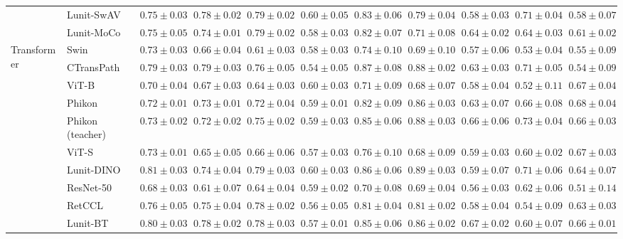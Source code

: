 \begin{tabular}{ll|cccc|c|cccc}
 & Lunit-SwAV & $0.75 \pm 0.03$ & $\mathbf{0.78 \pm 0.02}$ & $\mathbf{0.79 \pm 0.02}$ & $0.60 \pm 0.05$ & $0.83 \pm 0.06$ & $0.79 \pm 0.04$ & $0.58 \pm 0.03$ & $0.71 \pm 0.04$ & $0.58 \pm 0.07$ \\
 & Lunit-MoCo & $0.75 \pm 0.05$ & $0.74 \pm 0.01$ & $0.79 \pm 0.02$ & $0.58 \pm 0.03$ & $0.82 \pm 0.07$ & $0.71 \pm 0.08$ & $0.64 \pm 0.02$ & $0.64 \pm 0.03$ & $0.61 \pm 0.02$ \\
\cline{1-11}
\multirow[t]{12}{*}{Transformer} & Swin & $0.73 \pm 0.03$ & $0.66 \pm 0.04$ & $0.61 \pm 0.03$ & $0.58 \pm 0.03$ & $0.74 \pm 0.10$ & $0.69 \pm 0.10$ & $0.57 \pm 0.06$ & $0.53 \pm 0.04$ & $0.55 \pm 0.09$ \\
 & CTransPath & $0.79 \pm 0.03$ & $\mathbf{0.79 \pm 0.03}$ & $0.76 \pm 0.05$ & $0.54 \pm 0.05$ & $\mathbf{0.87 \pm 0.08}$ & $0.88 \pm 0.02$ & $0.63 \pm 0.03$ & $0.71 \pm 0.05$ & $0.54 \pm 0.09$ \\
 & ViT-B & $0.70 \pm 0.04$ & $0.67 \pm 0.03$ & $0.64 \pm 0.03$ & $0.60 \pm 0.03$ & $0.71 \pm 0.09$ & $0.68 \pm 0.07$ & $0.58 \pm 0.04$ & $0.52 \pm 0.11$ & $0.67 \pm 0.04$ \\
 & Phikon & $0.72 \pm 0.01$ & $0.73 \pm 0.01$ & $0.72 \pm 0.04$ & $0.59 \pm 0.01$ & $0.82 \pm 0.09$ & $0.86 \pm 0.03$ & $0.63 \pm 0.07$ & $0.66 \pm 0.08$ & $\mathbf{0.68 \pm 0.04}$ \\
 & Phikon (teacher) & $0.73 \pm 0.02$ & $0.72 \pm 0.02$ & $0.75 \pm 0.02$ & $0.59 \pm 0.03$ & $0.85 \pm 0.06$ & $0.88 \pm 0.03$ & $0.66 \pm 0.06$ & $\mathbf{0.73 \pm 0.04}$ & $0.66 \pm 0.03$ \\
 & ViT-S & $0.73 \pm 0.01$ & $0.65 \pm 0.05$ & $0.66 \pm 0.06$ & $0.57 \pm 0.03$ & $0.76 \pm 0.10$ & $0.68 \pm 0.09$ & $0.59 \pm 0.03$ & $0.60 \pm 0.02$ & $0.67 \pm 0.03$ \\
 & Lunit-DINO & $\mathbf{0.81 \pm 0.03}$ & $0.74 \pm 0.04$ & $\mathbf{0.79 \pm 0.03}$ & $\mathbf{0.60 \pm 0.03}$ & $0.86 \pm 0.06$ & $\mathbf{0.89 \pm 0.03}$ & $0.59 \pm 0.07$ & $0.71 \pm 0.06$ & $0.64 \pm 0.07$ \\
 & ResNet-50 & $0.68 \pm 0.03$ & $0.61 \pm 0.07$ & $0.64 \pm 0.04$ & $0.59 \pm 0.02$ & $0.70 \pm 0.08$ & $0.69 \pm 0.04$ & $0.56 \pm 0.03$ & $0.62 \pm 0.06$ & $0.51 \pm 0.14$ \\
 & RetCCL & $0.76 \pm 0.05$ & $0.75 \pm 0.04$ & $0.78 \pm 0.02$ & $0.56 \pm 0.05$ & $0.81 \pm 0.04$ & $0.81 \pm 0.02$ & $0.58 \pm 0.04$ & $0.54 \pm 0.09$ & $0.63 \pm 0.03$ \\
 & Lunit-BT & $0.80 \pm 0.03$ & $0.78 \pm 0.02$ & $0.78 \pm 0.03$ & $0.57 \pm 0.01$ & $0.85 \pm 0.06$ & $0.86 \pm 0.02$ & $\mathbf{0.67 \pm 0.02}$ & $0.60 \pm 0.07$ & $0.66 \pm 0.01$ \\

\end{tabular}
